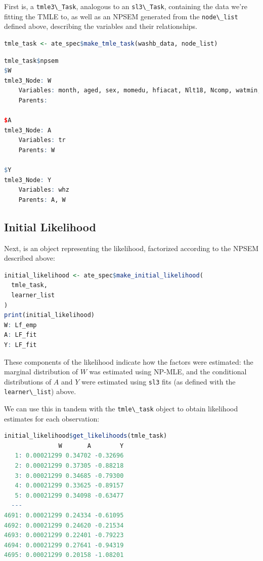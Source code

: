 \documentclass[12pt, krantz2,]{krantz}
\newcommand{\passthrough}[1]{#1}
\theoremstyle{definition}
\theoremstyle{definition}
\theoremstyle{definition}
\newcommand{\1}{\mathbbm{1}}
\begin{document}
First is, a \passthrough{\lstinline!tmle3\_Task!}, analogous to an \passthrough{\lstinline!sl3\_Task!}, containing the data we're
fitting the TMLE to, as well as an NPSEM generated from the \passthrough{\lstinline!node\_list!}
defined above, describing the variables and their relationships.

\begin{lstlisting}[language=R]
tmle_task <- ate_spec$make_tmle_task(washb_data, node_list)
\end{lstlisting}

\begin{lstlisting}[language=R]
tmle_task$npsem
$W
tmle3_Node: W
    Variables: month, aged, sex, momedu, hfiacat, Nlt18, Ncomp, watmin, elec, floor, walls, roof, asset_wardrobe, asset_table, asset_chair, asset_khat, asset_chouki, asset_tv, asset_refrig, asset_bike, asset_moto, asset_sewmach, asset_mobile, momage, momheight, delta_momage, delta_momheight
    Parents: 

$A
tmle3_Node: A
    Variables: tr
    Parents: W

$Y
tmle3_Node: Y
    Variables: whz
    Parents: A, W
\end{lstlisting}

\hypertarget{initial-likelihood}{%
\subsection{Initial Likelihood}\label{initial-likelihood}}

Next, is an object representing the likelihood, factorized according to the
NPSEM described above:

\begin{lstlisting}[language=R]
initial_likelihood <- ate_spec$make_initial_likelihood(
  tmle_task,
  learner_list
)
print(initial_likelihood)
W: Lf_emp
A: LF_fit
Y: LF_fit
\end{lstlisting}

These components of the likelihood indicate how the factors were estimated: the
marginal distribution of \(W\) was estimated using NP-MLE, and the conditional
distributions of \(A\) and \(Y\) were estimated using \passthrough{\lstinline!sl3!} fits (as defined with
the \passthrough{\lstinline!learner\_list!}) above.

We can use this in tandem with the \passthrough{\lstinline!tmle\_task!} object to obtain likelihood
estimates for each observation:

\begin{lstlisting}[language=R]
initial_likelihood$get_likelihoods(tmle_task)
               W       A        Y
   1: 0.00021299 0.34702 -0.32696
   2: 0.00021299 0.37305 -0.88218
   3: 0.00021299 0.34685 -0.79300
   4: 0.00021299 0.33625 -0.89157
   5: 0.00021299 0.34098 -0.63477
  ---                            
4691: 0.00021299 0.24334 -0.61095
4692: 0.00021299 0.24620 -0.21534
4693: 0.00021299 0.22401 -0.79223
4694: 0.00021299 0.27641 -0.94319
4695: 0.00021299 0.20158 -1.08201
\end{lstlisting}
\end{document}
